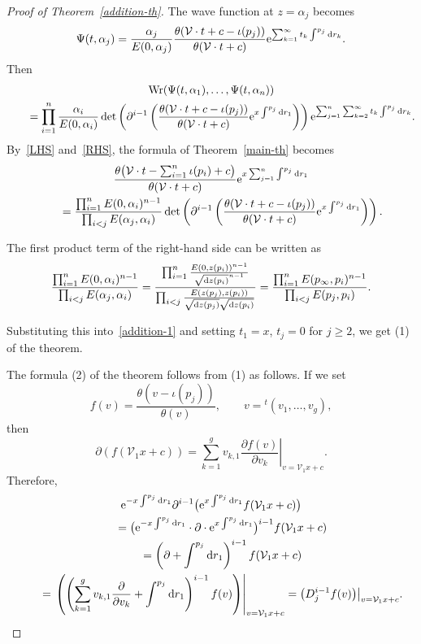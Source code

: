 \documentclass[10pt,a4paper]{amsart}
\numberwithin{equation}{section}
\theoremstyle{definition}
\begin{document}
\begin{proof}[Proof of Theorem~\ref{addition-th}]
The wave function at $z=\alpha_j$ becomes
\[
\Psi(t,\alpha_j)=\frac{\alpha_j}{E(0,\alpha_j)}
\frac{\theta({\mathcal V}\cdot t+c-\iota(p_j))}{\theta({\mathcal V}\cdot t+c)}
{\rm e}^{\sum_{k=1}^\infty t_k\int^{p_j} {\rm d}r_k}.
\]
Then
\begin{gather}
\operatorname{Wr}(\Psi(t,\alpha_1),\dots ,\Psi(t,\alpha_n))\nonumber
\\
\qquad=\prod_{i=1}^n\frac{\alpha_i}{E(0,\alpha_i)}
\det\left(
\partial^{i-1}
\left(
\frac{\theta({\mathcal V}\cdot t+c-\iota(p_j))}{\theta({\mathcal V}\cdot t+c)}
{\rm e}^{x\int^{p_j} {\rm d}r_1}
\right)
\right)
{\rm e}^{\sum_{j=1}^n\sum_{k=2}^\infty t_k\int^{p_j} {\rm d}r_k}.
\label{RHS}
\end{gather}
By~\eqref{LHS} and~\eqref{RHS}, the formula of Theorem~\ref{main-th} becomes
\begin{gather}
\frac{\theta\bigl({\mathcal V}\cdot t-\sum_{i=1}^n \iota(p_i)+c\bigr)}{\theta({\mathcal V}\cdot t+c)}
{\rm e}^{x\sum_{j=1}^n\int^{p_j} {\rm d}r_1}
\nonumber
\\
\qquad=
\frac{\prod_{i=1}^n E(0,\alpha_i)^{n-1}}{\prod_{i<j} E(\alpha_j,\alpha_i)}
\det\left(
\partial^{i-1}
\left(
\frac{\theta({\mathcal V}\cdot t+c-\iota(p_j))}{\theta({\mathcal V}\cdot t+c)}
{\rm e}^{x\int^{p_j} {\rm d}r_1}
\right)
\right).
\label{addition-1}
\end{gather}


The first product term of the right-hand side can be written as
\begin{gather*}
\frac{\prod_{i=1}^n E(0,\alpha_i)^{n-1}}{\prod_{i<j} E(\alpha_j,\alpha_i)}
=
\frac{
\prod_{i=1}^n \frac{E(0,z(p_i))^{n-1}}{\sqrt{{\rm d}z(p_i)}^{n-1}}
}
{
\prod_{i<j} \frac{E(z(p_j),z(p_i))}{\sqrt{{\rm d}z(p_j)}\sqrt{{\rm d}z(p_i)}}
}
=
\frac{\prod_{i=1}^n E(p_\infty,p_i)^{n-1}}{\prod_{i<j} E(p_j,p_i)}.
\end{gather*}

Substituting this into~\eqref{addition-1} and setting $t_1=x$, $t_j=0$ for $j\geq 2$, we get (1) of the theorem.

The formula (2) of the theorem follows from (1) as follows.
If we set
\[
f(v)=\frac{\theta(v-\iota(p_j))}{\theta(v)},
\qquad
v={}^t(v_1,\dots ,v_g),
\]
then
\[
\partial ( f({\mathcal V}_1 x+c) )
=\sum_{k=1}^g v_{k,1}\left.\frac{\partial f(v)}{\partial v_{k}}\right|_{v={\mathcal V}_1 x+c}.
\]
Therefore, \begin{gather}
{\rm e}^{-x\int^{p_j} {\rm d}r_1}\partial^{i-1}
\bigl({\rm e}^{x\int^{p_j} {\rm d}r_1} f({\mathcal V}_1 x+c) \bigr)
\nonumber
\\
\qquad=
\bigl({\rm e}^{-x\int^{p_j} {\rm d}r_1}\cdot \partial \cdot {\rm e}^{x\int^{p_j} {\rm d}r_1}\bigr)^{i-1}
f({\mathcal V}_1 x+c)
\nonumber
\\
\qquad=
\left(\partial +\int^{p_j} {\rm d}r_1\right)^{i-1}f({\mathcal V}_1 x+c)
\nonumber
\\
\qquad=\left.\left(\left(\sum_{k=1}^g v_{k,1}\frac{\partial}{\partial v_{k}}+\int^{p_j} {\rm d}r_1\right)^{i-1}
f(v)\right)\right|_{v={\mathcal V}_1 x+c}
=\bigl(D_j^{i-1}f(v)\bigr)\bigr|_{v={\mathcal V}_1 x+c}.
\label{derivative transformation}
\end{gather}


\end{proof}
\end{document}

